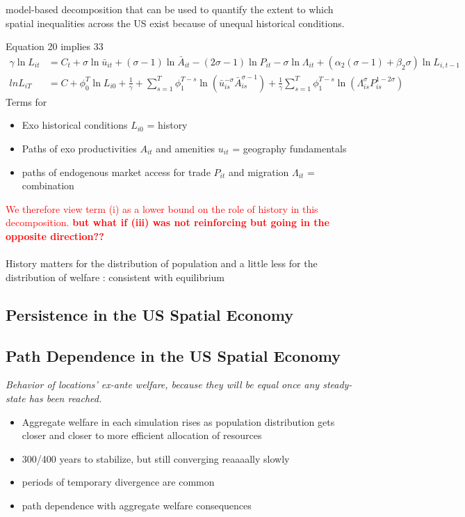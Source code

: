 \documentclass[12pt, final]{article}
\begin{document}
model-based decomposition that can be used to quantify the extent to which spatial inequalities across the US exist because of unequal historical conditions.

Equation 20 implies 33
\begin{align*}
    \gamma \ln L_{it} &= C_t + \sigma \ln \bar{u}_{it} + (\sigma - 1) \ln \bar{A}_{it} - (2 \sigma - 1) \ln P_{it} - \sigma \ln \Lambda_{it} + (\alpha_2 (\sigma - 1) + \beta_2 \sigma) \ln L_{i,t-1} \\
    ln L_{iT} &= C + \phi_0^T \ln L_{i0} + \frac{1}{\gamma} + \sum_{s=1}^T \phi_1^{T-s} \ln (\bar{u}_{is}^{-\sigma} \bar{A}_{is}^{\sigma-1}) + \frac{1}{\gamma} \sum_{s=1}^{T} \phi_1^{T-s} \ln (\Lambda_{is}^\sigma P_{is}^{1-2\sigma})
\end{align*}
Terms for
\begin{itemize}
    \item Exo historical conditions $L_{i0}$ = history
    \item Paths of exo productivities $A_{it}$ and amenities $u_{it}$ = geography fundamentals
    \item paths of endogenous market access for trade $P_{it}$ and migration $\Lambda_{it}$ = combination
\end{itemize}
\textcolor{red}{We therefore view term (i) as a lower bound on the role of history in this decomposition. \textbf{but what if (iii) was not reinforcing but going in the opposite direction??}}
\\
\\
History matters for the distribution of population and a little less for the distribution of welfare : consistent with equilibrium


\subsection*{Persistence in the US Spatial Economy} %
\label{sub:persistence_in_the_us_spatial_economy}



\subsection{Path Dependence in the US Spatial Economy} %
\label{sub:path_dependence_in_the_us_spatial_economy}

\textit{Behavior of locations' ex-ante welfare, because they will be equal once any steady-state has been reached.}

\begin{itemize}
    \item Aggregate welfare in each simulation rises as population distribution gets closer and closer to more efficient allocation of resources
    \item 300/400 years to stabilize, but still converging reaaaally slowly
    \item periods of temporary divergence are common
    \item path dependence with aggregate welfare consequences
\end{itemize}
\end{document}

